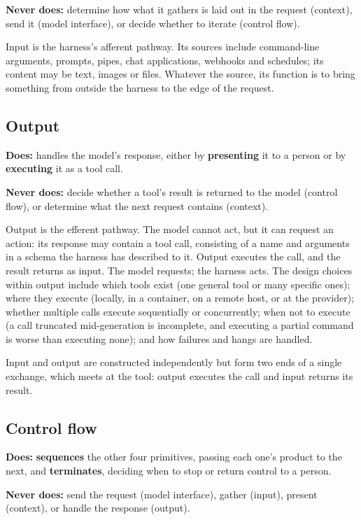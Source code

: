 \textbf{Never does:} determine how what it gathers is laid out in the request (context), send it (model interface), or decide whether to iterate (control flow).

Input is the harness's afferent pathway. Its sources include command-line arguments, prompts, pipes, chat applications, webhooks and schedules; its content may be text, images or files. Whatever the source, its function is to bring something from outside the harness to the edge of the request.

\subsection{Output}

\textbf{Does:} handles the model's response, either by \textbf{presenting} it to a person or by \textbf{executing} it as a tool call.

\textbf{Never does:} decide whether a tool's result is returned to the model (control flow), or determine what the next request contains (context).

Output is the efferent pathway. The model cannot act, but it can request an action: its response may contain a tool call, consisting of a name and arguments in a schema the harness has described to it. Output executes the call, and the result returns as input. The model requests; the harness acts. The design choices within output include which tools exist (one general tool or many specific ones); where they execute (locally, in a container, on a remote host, or at the provider); whether multiple calls execute sequentially or concurrently; when not to execute (a call truncated mid-generation is incomplete, and executing a partial command is worse than executing none); and how failures and hangs are handled.

Input and output are constructed independently but form two ends of a single exchange, which meets at the tool: output executes the call and input returns its result.

\subsection{Control flow}

\textbf{Does:} \textbf{sequences} the other four primitives, passing each one's product to the next, and \textbf{terminates}, deciding when to stop or return control to a person.

\textbf{Never does:} send the request (model interface), gather (input), present (context), or handle the response (output).

